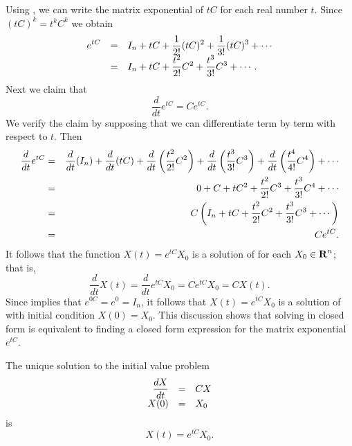 Using , we can write the matrix exponential of $tC$
for each real number $t$.  Since $(tC)^k = t^k C^k$ we obtain
\arraystart
\begin{equation}  \label{eq:MatrixExp}
\begin{array}{rcl}
\displaystyle e^{tC} & = & \displaystyle I_n + tC + \frac{1}{2!} (tC)^2 + \frac{1}{3!} (tC)^3
+\cdots\\
\displaystyle & = & \displaystyle I_n + tC + \frac{t^2}{2!} C^2 + \frac{t^3}{3!} C^3 +\cdots.
\end{array}
\end{equation}
\arrayfinish
Next we claim that
\begin{equation}  \label {e:diffmatexp}
  \frac{d}{dt} e^{tC} = Ce^{tC}.
\end{equation}
We verify the claim by supposing that we can differentiate
 term by term with respect to $t$. Then
\begin{eqnarray*}
  \displaystyle\frac{d}{dt} e^{tC} & = & \frac{d}{dt}(I_n) + \frac{d}{dt}(tC)
  + \frac{d}{dt}\left(\frac{t^2}{2!} C^2\right) +
  \frac{d}{dt}\left(\frac{t^3}{3!} C^3\right) +
  \frac{d}{dt}\left(\frac{t^4}{4!}C^4\right) + \cdots\\
     & = & 0 + C + t C^2 + \frac{t^2}{2!} C^3 +
\frac{t^3}{3!} C^4 + \cdots\\
     & = & C\left(I_n + tC + \frac{t^2}{2!} C^2 + \frac{t^3}{3!} C^3
+\cdots\right)\\
     & = & Ce^{tC}.
\end{eqnarray*}
It follows that the function $X(t) = e^{tC}X_0$ is a solution of
 for each $X_0\in\mbox{$\bf{R}$}^n$; that is,
\[
     \frac{d}{dt} X(t) =  \frac{d}{dt}  e^{tC}X_0
     = C e^{tC}X_0 = C X(t).
\]
Since  implies that $e^{0C} = e^0 = I_n$, it follows
that $X(t) = e^{tC}X_0$ is a solution of  with
initial condition $X(0)=X_0$.  This discussion shows that solving
 in closed form is equivalent to finding a closed
form expression for the matrix exponential $e^{tC}$.

\begin{thm}  \label{T:linODEsoln}
The unique solution to the
initial value problem
\arraystart
\[
\begin{array}{rcl}
\displaystyle\frac{dX}{dt} & = & CX \\
X(0) & = & X_0
\end{array}
\]
\arrayfinish
is
\[
X(t)=e^{tC}X_0.
\]
\end{thm}

